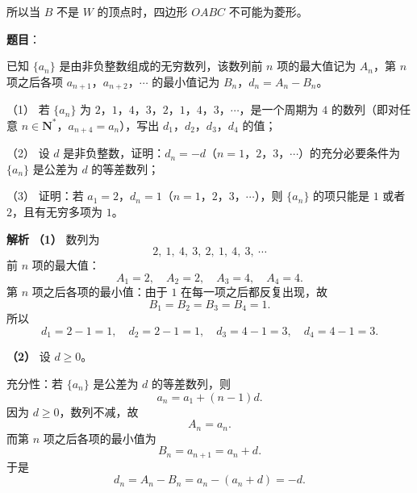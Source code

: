 \begin{answer}
所以当 $B$ 不是 $W$ 的顶点时，四边形 $OABC$ 不可能为菱形。



\end{answer}
\begin{answer}

\textbf{题目}：

已知 $\{a_n\}$ 是由非负整数组成的无穷数列，该数列前 $n$ 项的最大值记为 $A_n$，第 $n$ 项之后各项 $a_{n+1}$，$a_{n+2}$，$\cdots$ 的最小值记为 $B_n$，$d_n=A_n-B_n$。

（1） 若 $\{a_n\}$ 为 $2$，$1$，$4$，$3$，$2$，$1$，$4$，$3$，$\cdots$，是一个周期为 $4$ 的数列（即对任意 $n\in\mathbf N^*$，$a_{n+4}=a_n$），写出 $d_1$，$d_2$，$d_3$，$d_4$ 的值；

（2） 设 $d$ 是非负整数，证明：$d_n=-d$（$n=1$，$2$，$3$，$\cdots$）的充分必要条件为 $\{a_n\}$ 是公差为 $d$ 的等差数列；

（3） 证明：若 $a_1=2$，$d_n=1$（$n=1$，$2$，$3$，$\cdots$），则 $\{a_n\}$ 的项只能是 $1$ 或者 $2$，且有无穷多项为 $1$。

\textbf{解析}
\textbf{（1）} 数列为
\nopagebreak[4]
\[2,\ 1,\ 4,\ 3,\ 2,\ 1,\ 4,\ 3,\ \cdots\]
前 $n$ 项的最大值：
\nopagebreak[4]
\[A_1=2,\quad A_2=2,\quad A_3=4,\quad A_4=4.\]
第 $n$ 项之后各项的最小值：由于 $1$ 在每一项之后都反复出现，故
\nopagebreak[4]
\[B_1=B_2=B_3=B_4=1.\]
所以
\nopagebreak[4]
\[d_1=2-1=1,\quad d_2=2-1=1,\quad d_3=4-1=3,\quad d_4=4-1=3.\]

\textbf{（2）} 设 $d\geqslant0$。

充分性：若 $\{a_n\}$ 是公差为 $d$ 的等差数列，则
\nopagebreak[4]
\[a_n=a_1+(n-1)d.\]
因为 $d\geqslant0$，数列不减，故
\nopagebreak[4]
\[A_n=a_n.\]
而第 $n$ 项之后各项的最小值为
\nopagebreak[4]
\[B_n=a_{n+1}=a_n+d.\]
于是
\nopagebreak[4]
\[d_n=A_n-B_n=a_n-(a_n+d)=-d.\]


\end{answer}
